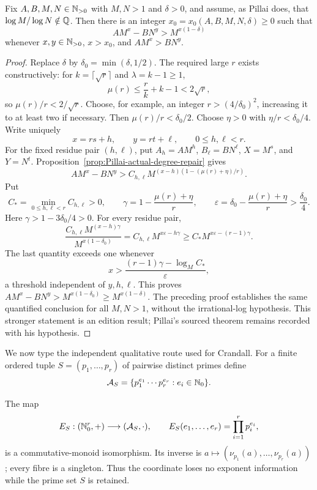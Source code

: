 \begin{theorem}
\label{thm:Pillai-repaired-quantitative}
Fix $A,B,M,N\in\mathbb{N}_{>0}$ with $M,N>1$ and $\delta>0$, and assume, as Pillai
does, that $\log M/\log N\notin\mathbb{Q}$.  Then there is an integer
$x_0=x_0(A,B,M,N,\delta)\geq0$ such that
\begin{equation}
\label{eq:Pillai-repaired-theorem-I}
 AM^x-BN^y>M^{x(1-\delta)}
\end{equation}
whenever $x,y\in\mathbb{N}_{>0}$, $x>x_0$, and $AM^x>BN^y$.
\end{theorem}

\begin{proof}
Replace $\delta$ by $\delta_0=\min(\delta,1/2)$.  The required large $r$
exists constructively: for $k=\lceil\sqrt r\rceil$ and
$\lambda=k-1\geq1$,
\[
 \mu(r)\leq\frac r{k}+k-1<2\sqrt r,
\]
so $\mu(r)/r<2/\sqrt r$.  Choose, for example, an integer
$r>(4/\delta_0)^2$, increasing it to at least two if necessary.  Then
$\mu(r)/r<\delta_0/2$.  Choose $\eta>0$ with
$\eta/r<\delta_0/4$.  Write uniquely
\[
 x=rs+h,\qquad y=rt+\ell,
 \qquad 0\leq h,\ell<r.
\]
For the fixed residue pair $(h,\ell)$, put
$A_h=AM^h$, $B_\ell=BN^\ell$, $X=M^s$, and $Y=N^t$.
Proposition~\ref{prop:Pillai-actual-degree-repair} gives
\[
 AM^x-BN^y
 >C_{h,\ell}M^{(x-h)(1-(\mu(r)+\eta)/r)}.
\]
Put
\[
 C_*=\min_{0\leq h,\ell<r}C_{h,\ell}>0,
 \qquad
 \gamma=1-\frac{\mu(r)+\eta}{r},
 \qquad
 \varepsilon=\delta_0-\frac{\mu(r)+\eta}{r}>\frac{\delta_0}{4}.
\]
Here $\gamma>1-3\delta_0/4>0$.  For every residue pair,
\[
 \frac{C_{h,\ell}M^{(x-h)\gamma}}{M^{x(1-\delta_0)}}
 =C_{h,\ell}M^{x\varepsilon-h\gamma}
 \geq C_*M^{x\varepsilon-(r-1)\gamma}.
\]
The last quantity exceeds one whenever
\[
 x>\frac{(r-1)\gamma-\log_M C_*}{\varepsilon},
\]
a threshold independent of $y,h,\ell$.  This proves
$AM^x-BN^y>M^{x(1-\delta_0)}\geq M^{x(1-\delta)}$.
The preceding proof establishes the same quantified conclusion for all
$M,N>1$, without the irrational-log hypothesis.  This stronger statement is
an edition result; Pillai's sourced theorem remains recorded with his
hypothesis.
\end{proof}

We now type the independent qualitative route used for Crandall.  For a
finite ordered tuple $S=(p_1,\ldots,p_r)$ of pairwise distinct primes define
\[
 \mathcal A_S
 =\{p_1^{e_1}\cdots p_r^{e_r}:e_i\in\mathbb{N}_{0}\}.
\]

\begin{proposition}
\label{prop:Polya-smooth-coordinate}
The map
\[
 E_S:(\mathbb{N}_{0}^r,+)\longrightarrow(\mathcal A_S,\mathord\cdot),
 \qquad
 E_S(e_1,\ldots,e_r)=\prod_{i=1}^r p_i^{e_i},
\]
is a commutative-monoid isomorphism.  Its inverse is
$a\mapsto(\nu_{p_1}(a),\ldots,\nu_{p_r}(a))$; every fibre is a singleton.
Thus the coordinate loses no exponent information while the prime set $S$
is retained.
\end{proposition}

